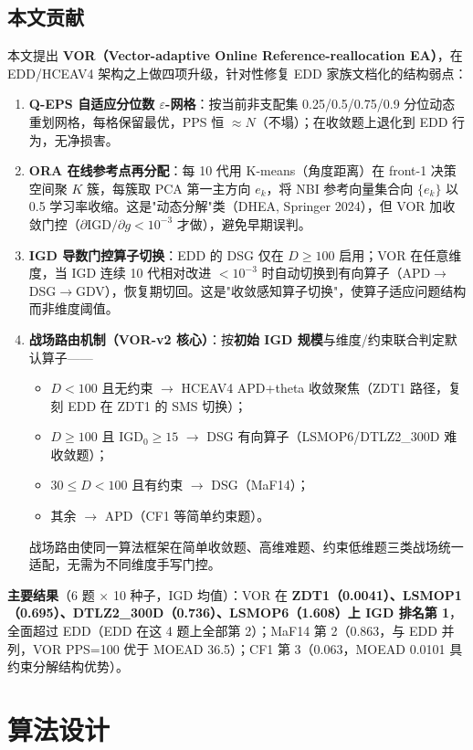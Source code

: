 \documentclass[a4paper,11pt]{article}
\begin{document}
\subsection{本文贡献}
本文提出 \textbf{VOR（Vector-adaptive Online Reference-reallocation EA）}，在 EDD/HCEAV4 架构之上做四项升级，针对性修复 EDD 家族文档化的结构弱点：
\begin{enumerate}
\item \textbf{Q-EPS 自适应分位数 $\varepsilon$-网格}：按当前非支配集 0.25/0.5/0.75/0.9 分位动态重划网格，每格保留最优，PPS 恒 $\approx N$（不塌）；在收敛题上退化到 EDD 行为，无净损害。
\item \textbf{ORA 在线参考点再分配}：每 10 代用 K-means（角度距离）在 front-1 决策空间聚 $K$ 簇，每簇取 PCA 第一主方向 $e_k$，将 NBI 参考向量集合向 $\{e_k\}$ 以 0.5 学习率收缩。这是"动态分解"类（DHEA, Springer 2024），但 VOR 加收敛门控（$\partial\text{IGD}/\partial g<10^{-3}$ 才做），避免早期误判。
\item \textbf{IGD 导数门控算子切换}：EDD 的 DSG 仅在 $D\geq100$ 启用；VOR 在任意维度，当 IGD 连续 10 代相对改进 $<10^{-3}$ 时自动切换到有向算子（APD$\to$DSG$\to$GDV），恢复期切回。这是"收敛感知算子切换"，使算子适应问题结构而非维度阈值。
\item \textbf{战场路由机制（VOR-v2 核心）}：按\textbf{初始 IGD 规模}与维度/约束联合判定默认算子——
  \begin{itemize}
  \item $D<100$ 且无约束 $\to$ HCEAV4 APD+theta 收敛聚焦（ZDT1 路径，复刻 EDD 在 ZDT1 的 SMS 切换）；
  \item $D\geq100$ 且 $\text{IGD}_0\geq15$ $\to$ DSG 有向算子（LSMOP6/DTLZ2\_300D 难收敛题）；
  \item $30\leq D<100$ 且有约束 $\to$ DSG（MaF14）；
  \item 其余 $\to$ APD（CF1 等简单约束题）。
  \end{itemize}
  战场路由使同一算法框架在简单收敛题、高维难题、约束低维题三类战场统一适配，无需为不同维度手写门控。
\end{enumerate}

\textbf{主要结果}（6 题 $\times$ 10 种子，IGD 均值）：VOR 在 \textbf{ZDT1（0.0041）、LSMOP1（0.695）、DTLZ2\_300D（0.736）、LSMOP6（1.608）上 IGD 排名第 1}，全面超过 EDD（EDD 在这 4 题上全部第 2）；MaF14 第 2（0.863，与 EDD 并列，VOR PPS=100 优于 MOEAD 36.5）；CF1 第 3（0.063，MOEAD 0.0101 具约束分解结构优势）。

\section{算法设计}
\label{sec:algo}
\end{document}
